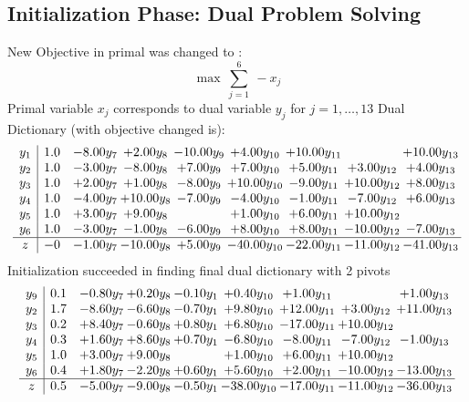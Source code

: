 \documentclass[8pt]{article}
\begin{document}
\subsection{Initialization Phase: Dual Problem Solving}
New Objective in primal was changed to : \[ \max\ \sum_{j=1}^{6}\ - x_j \] 
Primal variable $x_j$ corresponds to dual variable $y_j$ for $j = 1,\ldots,13$
Dual Dictionary (with objective changed is): 
\[\begin{array}{c| c c@{\hskip 2pt} c@{\hskip 2pt} c@{\hskip 2pt} c@{\hskip 2pt} c@{\hskip 2pt} c@{\hskip 2pt} c@{\hskip 2pt} }
 y_{1}   &  1.0 & -8.00 y_{7} & +  2.00 y_{8} & -10.00 y_{9} & +  4.00 y_{10} & + 10.00 y_{11} &   & + 10.00 y_{13}\\
 y_{2}   &  1.0 & -3.00 y_{7} & -8.00 y_{8} & +  7.00 y_{9} & +  7.00 y_{10} & +  5.00 y_{11} & +  3.00 y_{12} & +  4.00 y_{13}\\
 y_{3}   &  1.0 & +  2.00 y_{7} & +  1.00 y_{8} & -8.00 y_{9} & + 10.00 y_{10} & -9.00 y_{11} & + 10.00 y_{12} & +  8.00 y_{13}\\
 y_{4}   &  1.0 & -4.00 y_{7} & + 10.00 y_{8} & -7.00 y_{9} & -4.00 y_{10} & -1.00 y_{11} & -7.00 y_{12} & +  6.00 y_{13}\\
 y_{5}   &  1.0 & +  3.00 y_{7} & +  9.00 y_{8} &   & +  1.00 y_{10} & +  6.00 y_{11} & + 10.00 y_{12} &   \\
 y_{6}   &  1.0 & -3.00 y_{7} & -1.00 y_{8} & -6.00 y_{9} & +  8.00 y_{10} & +  8.00 y_{11} & -10.00 y_{12} & -7.00 y_{13}\\
\hline
z    &  -0 & -1.00 y_{7} & -10.00 y_{8} & +  5.00 y_{9} & -40.00 y_{10} & -22.00 y_{11} & -11.00 y_{12} & -41.00 y_{13}\\
\end{array}\]
Initialization succeeded in finding final dual dictionary with 2 pivots
\[\begin{array}{c| c c@{\hskip 2pt} c@{\hskip 2pt} c@{\hskip 2pt} c@{\hskip 2pt} c@{\hskip 2pt} c@{\hskip 2pt} c@{\hskip 2pt} }
 y_{9}   &  0.1 & -0.80 y_{7} & +  0.20 y_{8} & -0.10 y_{1} & +  0.40 y_{10} & +  1.00 y_{11} &   & +  1.00 y_{13}\\
 y_{2}   &  1.7 & -8.60 y_{7} & -6.60 y_{8} & -0.70 y_{1} & +  9.80 y_{10} & + 12.00 y_{11} & +  3.00 y_{12} & + 11.00 y_{13}\\
 y_{3}   &  0.2 & +  8.40 y_{7} & -0.60 y_{8} & +  0.80 y_{1} & +  6.80 y_{10} & -17.00 y_{11} & + 10.00 y_{12} &   \\
 y_{4}   &  0.3 & +  1.60 y_{7} & +  8.60 y_{8} & +  0.70 y_{1} & -6.80 y_{10} & -8.00 y_{11} & -7.00 y_{12} & -1.00 y_{13}\\
 y_{5}   &  1.0 & +  3.00 y_{7} & +  9.00 y_{8} &   & +  1.00 y_{10} & +  6.00 y_{11} & + 10.00 y_{12} &   \\
 y_{6}   &  0.4 & +  1.80 y_{7} & -2.20 y_{8} & +  0.60 y_{1} & +  5.60 y_{10} & +  2.00 y_{11} & -10.00 y_{12} & -13.00 y_{13}\\
\hline
z    &  0.5 & -5.00 y_{7} & -9.00 y_{8} & -0.50 y_{1} & -38.00 y_{10} & -17.00 y_{11} & -11.00 y_{12} & -36.00 y_{13}\\
\end{array}\]
\end{document}
